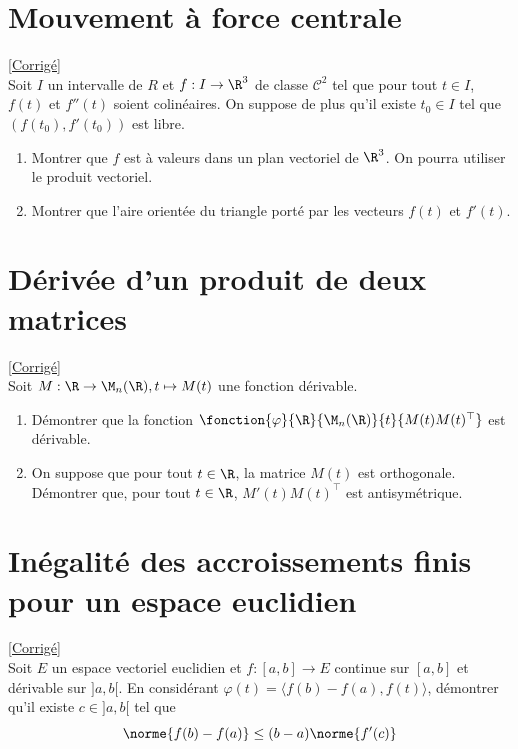 \documentclass{book}
\begin{document}
\section{Mouvement à force centrale}
\label{Mouvement à force centrale}
\textcolor{blue}{\hyperref[sec:mouvement-a-force-centrale]{[Corrigé]}}\\
Soit $I$ un intervalle de $R$ et $f:I\to\R^3$ de classe $\mathcal{C}^2$ tel que pour tout $t\in I$, $f(t)$ et $f''(t)$ soient colinéaires. On suppose de plus qu'il existe $t_0\in I$ tel que $(f(t_0),f'(t_0))$ est libre.
\begin{enumerate}
	\item Montrer que $f$ est à valeurs dans un plan vectoriel de $\R^3$. On pourra utiliser le produit vectoriel.
	\item Montrer que l'aire orientée du triangle porté par les vecteurs $f(t)$ et $f'(t)$.
\end{enumerate}

\section{Dérivée d'un produit de deux matrices}
\label{Dérivée d'un produit de deux matrices}
\textcolor{blue}{\hyperref[sec:derivee-dun-produit-de-deux-matrices]{[Corrigé]}}\\
Soit $M:\R\to\M_n(\R),t\mapsto M(t)$ une fonction dérivable.
\begin{enumerate}
	\item Démontrer que la fonction $\fonction{\varphi}{\R}{\M_n(\R)}{t}{M(t)M(t)^\top}$ est dérivable.
	\item On suppose que pour tout $t\in\R$, la matrice $M(t)$ est orthogonale.\\
	Démontrer que, pour tout $t\in\R$, $M'(t)M(t)^\top$ est antisymétrique.
\end{enumerate}

\section{Inégalité des accroissements finis pour un espace euclidien}
\label{Inégalité des accroissements finis pour un espace euclidien}
\textcolor{blue}{\hyperref[sec:inegalite-des-accroissements-finis-pour-un-espace-euclidien]{[Corrigé]}}\\
Soit $E$ un espace vectoriel euclidien et $f:[a,b]\to E$ continue sur $[a,b]$ et dérivable sur $]a,b[$.
En considérant $\varphi(t)=\langle f(b)-f(a),f(t)\rangle$, démontrer qu'il existe $c\in]a,b[$ tel que \[\norme{ f(b)-f(a)}\leq (b-a)\norme{f'(c)}\]
\end{document}
